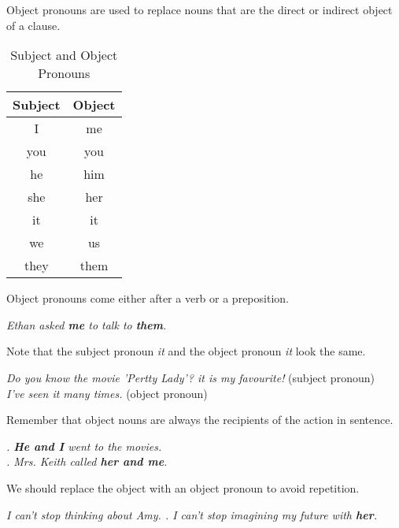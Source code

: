 \documentclass[10pt,a4paper]{article}
\begin{document}
Object pronouns are used to replace nouns that are the direct or indirect object of a clause.
\begin{table}[h]
\begin{center}
\begin{tabular}{|c|c|}
	\hline
	\textbf{Subject} & \textbf{Object} \\
	\hline
	I & me \\ \hline
	you & you \\ \hline
	he & him \\ \hline
	she & her \\ \hline
	it & it \\ \hline
	we & us \\ \hline
	they & them \\
	\hline
\end{tabular}
\end{center}
\caption{\label{tab:nouns5}Subject and Object Pronouns}
\end{table}

Object pronouns come either after a verb or a preposition.
\begin{center}
\textit{
Ethan asked \textbf{me} to talk to \textbf{them}.}
\end{center}

Note that the subject pronoun \textit{it} and the object pronoun \textit{it} look the same.

\begin{center}
\textit{
Do you know the movie 'Pertty Lady'? \textit{it} is my favourite!} (subject pronoun)\\
\textit{ I've seen \textit{it} many times.} (object pronoun)
\end{center}
Remember that object nouns are always the recipients of the action in sentence.
\begin{center}
\textit{
		. \textbf{He and I} went to the movies.\\
. Mrs. Keith called \textbf{her and me}.}
\end{center}

We should replace the object with an object pronoun to avoid repetition.
\begin{center}
\textit{
I can't stop thinking about Amy. . I can't stop imagining my future with \textbf{her}.}
\end{center}
\end{document}
